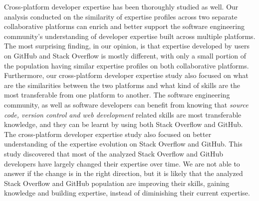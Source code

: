         Cross-platform developer expertise has been thoroughly studied as well. Our analysis conducted on the similarity of expertise profiles across two separate collaborative platforms can enrich and better support the software engineering community's understanding of developer expertise built across multiple platforms. The most surprising finding, in our opinion, is that expertise developed by users on GitHub and Stack Overflow is mostly different, with only a small portion of the population having similar expertise profiles on both collaborative platforms. Furthermore, our cross-platform developer expertise study also focused on what are the similarities between the two platforms and what kind of skills are the most transferable from one platform to another. The software engineering community, as well as software developers can benefit from knowing that \emph{source code, version control and web development} related skills are most transferable knowledge, and they can be learnt by using both Stack Overflow and GitHub. The cross-platform developer expertise study also focused on better understanding of the expertise evolution on Stack Overflow and GitHub. This study discovered that most of the analyzed Stack Overflow and GitHub developers have largely changed their expertise over time. We are not able to answer if the change is in the right direction, but it is likely that the analyzed Stack Overflow and GitHub population are improving their skills, gaining knowledge and building expertise, instead of diminishing their current expertise.
        
